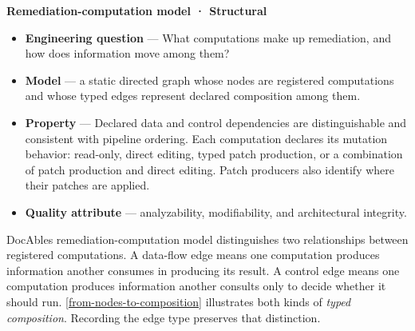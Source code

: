 \textbf{Remediation-computation model · Structural}

\begin{itemize}
\tightlist
\item
  \textbf{Engineering question} --- What computations make up remediation, and how does information move among them?
\end{itemize}

\begin{itemize}
\tightlist
\item
  \textbf{Model} --- a static directed graph whose nodes are registered computations and whose typed edges represent declared composition among them.
\end{itemize}

\begin{itemize}
\tightlist
\item
  \textbf{Property} --- Declared data and control dependencies are distinguishable and consistent with pipeline ordering. Each computation declares its mutation behavior: read-only, direct editing, typed patch production, or a combination of patch production and direct editing. Patch producers also identify where their patches are applied.
\end{itemize}

\begin{itemize}
\tightlist
\item
  \textbf{Quality attribute} --- analyzability, modifiability, and architectural integrity.
\end{itemize}


DocAble\textquotesingle s remediation-computation model distinguishes two relationships between registered computations. A data-flow edge means one computation produces information another consumes in producing its result. A control edge means one computation produces information another consults only to decide whether it should run. \autoref{from-nodes-to-composition} illustrates both kinds of \emph{typed composition}. Recording the edge type preserves that distinction.

